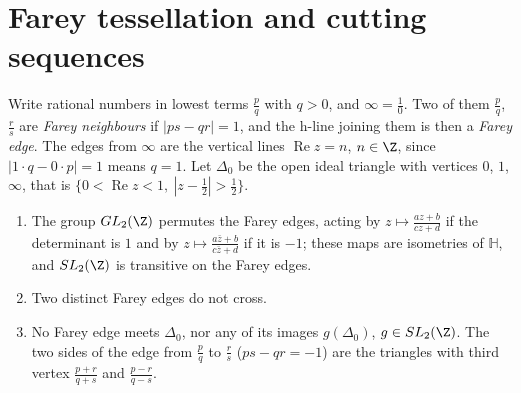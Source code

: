 \section{Farey tessellation and cutting sequences}

Write rational numbers in lowest terms $\frac pq$ with $q>0$, and $\infty=\frac10$. Two of them $\frac pq$, $\frac rs$ are \emph{Farey neighbours} if $|ps-qr|=1$, and the h-line joining them is then a
\emph{Farey edge}. The edges from $\infty$ are the vertical lines $\operatorname{Re}z=n$, $n\in\Z$, since $|1\cdot q-0\cdot p|=1$ means $q=1$. Let $\Delta_0$ be the open ideal triangle with vertices $0$, $1$,
$\infty$, that is $\{0<\operatorname{Re}z<1,\ |z-\frac12|>\frac12\}$.

\begin{proposition}\label{prop:farey}
\begin{enumerate}
\item[(a)] The group $GL_2(\Z)$ permutes the Farey edges, acting by $z\mapsto\frac{az+b}{cz+d}$ if the determinant is $1$ and by $z\mapsto\frac{a\bar z+b}{c\bar z+d}$ if it is $-1$; these maps are isometries
of $\mathbb H$, and $SL_2(\Z)$ is transitive on the Farey edges.
\item[(b)] Two distinct Farey edges do not cross.
\item[(c)] No Farey edge meets $\Delta_0$, nor any of its images $g(\Delta_0)$, $g\in SL_2(\Z)$. The two sides of the edge from $\frac pq$ to $\frac rs$ ($ps-qr=-1$) are the triangles with third vertex
$\frac{p+r}{q+s}$ and $\frac{p-r}{q-s}$.
\end{enumerate}
\end{proposition}

